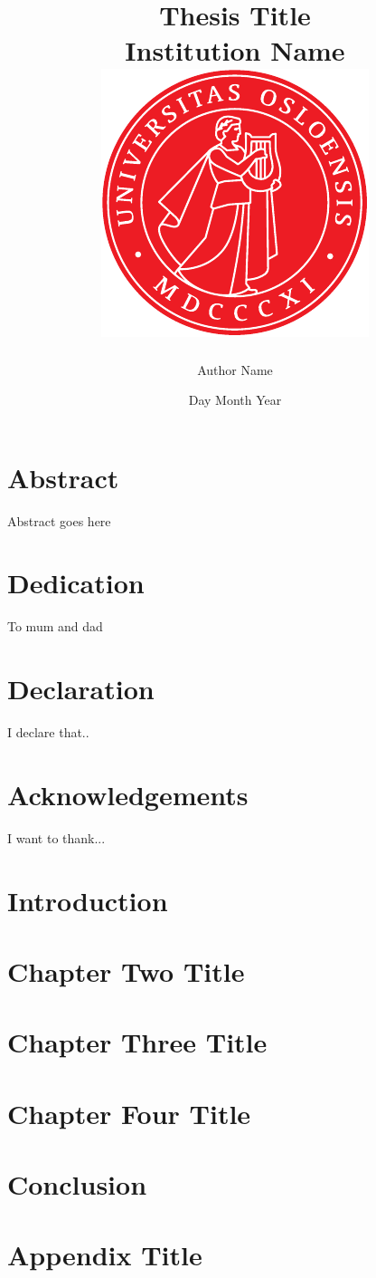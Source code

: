 \documentclass[12pt]{report}
\title{
{Thesis Title}\\
{\Large Institution Name}\\
{\includegraphics{uio.pdf}}
}
\author{Author Name}
\date{Day Month Year}
\begin{document}
\maketitle

\chapter*{Abstract}
Abstract goes here
 
\chapter*{Dedication}
To mum and dad
 
\chapter*{Declaration}
I declare that..
 
\chapter*{Acknowledgements}
I want to thank...
 
\tableofcontents

\chapter{Introduction}

 
\chapter{Chapter Two Title}

 
\chapter{Chapter Three Title}

 
\chapter{Chapter Four Title}

 
\chapter{Conclusion}


\appendix
\chapter{Appendix Title}

\end{document}
